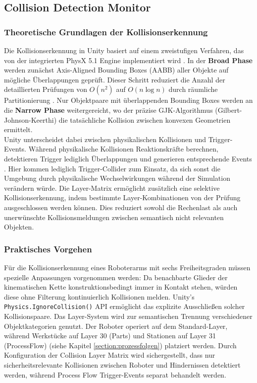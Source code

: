 \subsection{Collision Detection Monitor}
\subsubsection{Theoretische Grundlagen der Kollisionserkennung}
\noindent
Die Kollisionserkennung in Unity basiert auf einem zweistufigen Verfahren, das
von der integrierten PhysX 5.1 Engine implementiert wird
. In der \textbf{Broad Phase} werden zunächst
Axis-Aligned Bounding Boxes (AABB) aller Objekte auf mögliche Überlappungen
geprüft. Dieser Schritt reduziert die Anzahl der detaillierten Prüfungen von
$O(n^2)$ auf $O(n \log n)$ durch räumliche Partitionierung
. Nur Objektpaare mit überlappenden Bounding Boxes
werden an die \textbf{Narrow Phase} weitergereicht, wo der präzise
GJK-Algorithmus (Gilbert-Johnson-Keerthi) die tatsächliche Kollision zwischen
konvexen Geometrien ermittelt.\\

\noindent
Unity unterscheidet dabei zwischen physikalischen Kollisionen und
Trigger-Events. Während physikalische Kollisionen Reaktionskräfte berechnen,
detektieren Trigger lediglich Überlappungen und generieren entsprechende Events
. Hier kommen lediglich Trigger-Collider zum Einsatz,
da sich sonst die Umgebung durch physikalische Wechselwirkungen während der
Simulation verändern würde. Die Layer-Matrix ermöglicht zusätzlich eine selektive
Kollisionserkennung, indem bestimmte Layer-Kombinationen von der Prüfung
ausgeschlossen werden können. Dies reduziert sowohl die Rechenlast als auch
unerwünschte Kollisionsmeldungen zwischen semantisch nicht relevanten Objekten.

\subsubsection{Praktisches Vorgehen}
\noindent
Für die Kollisionserkennung eines Roboterarms mit sechs Freiheitsgraden müssen
spezielle Anpassungen vorgenommen werden: Da benachbarte Glieder der
kinematischen Kette konstruktionsbedingt immer in Kontakt stehen, würden diese
ohne Filterung kontinuierlich Kollisionen melden. Unity's
\texttt{Physics.IgnoreCollision()} API ermöglicht das explizite Ausschließen
solcher Kollisionspaare.
\noindent
Das Layer-System wird zur semantischen Trennung verschiedener Objektkategorien
genutzt. Der Roboter operiert auf dem Standard-Layer, während Werkstücke auf
Layer 30 (Parts) und Stationen auf Layer 31 (ProcessFlow) (siehe Kapitel
\ref{section:prozessfolgen}) platziert werden.
Durch Konfiguration der Collision Layer Matrix wird sichergestellt, dass nur
sicherheitsrelevante Kollisionen zwischen Roboter und Hindernissen detektiert
werden, während Process Flow Trigger-Events separat behandelt werden.

